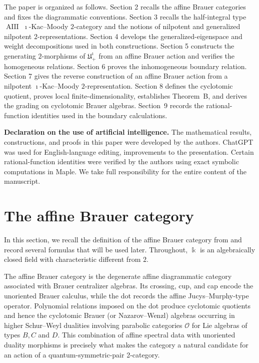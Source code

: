 \documentclass[a4,10pt]{amsart}
\numberwithin{equation}{section}
\theoremstyle{definition}
\begin{document}
The paper is organized as follows. Section 2 recalls the affine Brauer categories and fixes the diagrammatic conventions. Section 3 recalls the half-integral type $\operatorname{AIII}$ $\imath$-Kac--Moody $2$-category and the notions of nilpotent and generalized nilpotent $2$-representations. Section 4 develops the generalized-eigenspace and weight decompositions used in both constructions. Section 5 constructs the generating $2$-morphisms of $\mathfrak  U^{\imath}_{+}$  from an affine Brauer action and verifies the homogeneous relations. Section 6 proves the inhomogeneous boundary relation. Section 7 gives the reverse construction of an affine Brauer action from a nilpotent $\imath$-Kac--Moody $2$-representation. Section 8 defines the cyclotomic quotient, proves local finite-dimensionality, establishes Theorem~B, and derives the grading on cyclotomic Brauer algebras. Section~9  records the rational-function identities used in the boundary calculations.

\textbf{Declaration on the use of artificial intelligence.}
The mathematical results, constructions, and proofs in this paper
were developed by the authors. ChatGPT was used for English-language
editing, improvements to the presentation.
Certain rational-function identities were 
verified  by the authors using exact symbolic computations
in Maple. We
take full responsibility for the entire content of the manuscript.



\section{The affine Brauer category} 
In this section, we recall the definition of the affine Brauer category from
 \cite[Definition~1.2]{RS-cyc} and record several  formulas that will be used  later. Throughout, $\Bbbk$ is an algebraically closed field with characteristic different from $2$. 

The affine Brauer category is the degenerate affine diagrammatic category associated with Brauer centralizer algebras. Its crossing, cup, and cap encode the unoriented Brauer calculus, while the dot records the affine Jucys–Murphy-type operator. Polynomial relations imposed on the dot produce cyclotomic quotients and hence the cyclotomic Brauer (or Nazarov–Wenzl) algebras occurring in higher Schur--Weyl dualities involving parabolic categories $\mathcal O$ for Lie algebras of types $B,C$ and $D$. This combination of affine spectral data with unoriented duality morphisms is precisely what makes the category a natural candidate for an action of a quantum-symmetric-pair 2-category.
\end{document}

